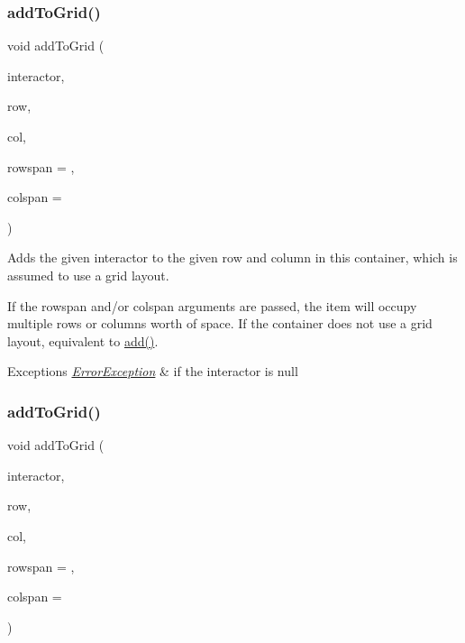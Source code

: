 \subsubsection{\texorpdfstring{add\+To\+Grid()}{addToGrid()}\hspace{0.1cm}{\footnotesize\ttfamily [1/2]}}
{\footnotesize\ttfamily void add\+To\+Grid (\begin{DoxyParamCaption}\item[{\mbox{\hyperlink{classGInteractor}{G\+Interactor}} $\ast$}]{interactor,  }\item[{int}]{row,  }\item[{int}]{col,  }\item[{int}]{rowspan = {},  }\item[{int}]{colspan = {} }\end{DoxyParamCaption})\hspace{0.3cm}{\ttfamily [virtual]}}



Adds the given interactor to the given row and column in this container, which is assumed to use a grid layout. 

If the rowspan and/or colspan arguments are passed, the item will occupy multiple rows or columns\textquotesingle{} worth of space. If the container does not use a grid layout, equivalent to \mbox{\hyperlink{classGContainer_a6f99b7c841256dbdc5acaafbbca4e685}{add()}}. 
\begin{DoxyExceptions}{Exceptions}
{\em \mbox{\hyperlink{classErrorException}{Error\+Exception}}} & if the interactor is null \\
\hline
\end{DoxyExceptions}
\mbox{\label{classGContainer_abc297ebf9136261c21e2df3c771df0b3}} 
\subsubsection{\texorpdfstring{add\+To\+Grid()}{addToGrid()}\hspace{0.1cm}{\footnotesize\ttfamily [2/2]}}
{\footnotesize\ttfamily void add\+To\+Grid (\begin{DoxyParamCaption}\item[{\mbox{\hyperlink{classGInteractor}{G\+Interactor}} \&}]{interactor,  }\item[{int}]{row,  }\item[{int}]{col,  }\item[{int}]{rowspan = {},  }\item[{int}]{colspan = {} }\end{DoxyParamCaption})\hspace{0.3cm}{\ttfamily [virtual]}}



